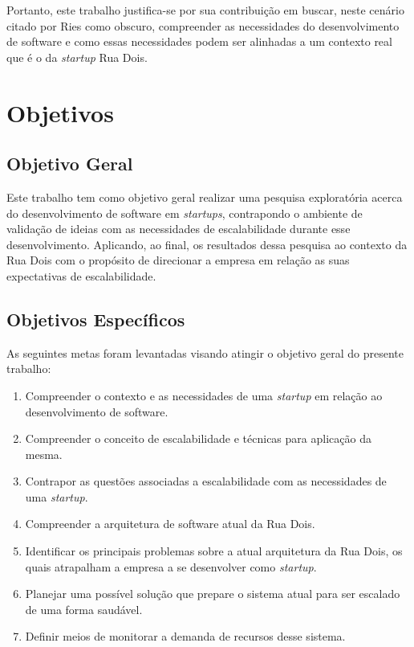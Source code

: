 Portanto, este trabalho justifica-se por sua contribuição em buscar, neste
cenário citado por Ries como obscuro, compreender as necessidades do desenvolvimento
de software e como essas necessidades podem ser alinhadas a um contexto real
que é o da \textit{startup} Rua Dois.

\section{Objetivos}

\subsection{Objetivo Geral}

Este trabalho tem como objetivo geral realizar uma pesquisa exploratória acerca
do desenvolvimento de software em \textit{startups}, contrapondo o ambiente de
validação de ideias com as necessidades de escalabilidade durante esse
desenvolvimento. Aplicando, ao final, os resultados dessa pesquisa ao contexto
da Rua Dois com o propósito de direcionar a empresa em relação as suas
expectativas de escalabilidade.

\subsection{Objetivos Específicos}

As seguintes metas foram levantadas visando atingir o objetivo geral do presente
trabalho:

  \begin{enumerate}
    \item Compreender o contexto e as necessidades de uma \textit{startup} em
    relação ao desenvolvimento de software.
    \item Compreender o conceito de escalabilidade e técnicas para aplicação
    da mesma.
    \item Contrapor as questões associadas a escalabilidade com as necessidades
    de uma \textit{startup}.
    \item Compreender a arquitetura de software atual da Rua Dois.
    \item Identificar os principais problemas sobre a atual arquitetura da Rua
    Dois, os quais atrapalham a empresa a se desenvolver como \textit{startup}.
    \item Planejar uma possível solução que prepare o sistema atual para ser
    escalado de uma forma saudável.
    \item Definir meios de monitorar a demanda de recursos desse sistema.
  \end{enumerate}

